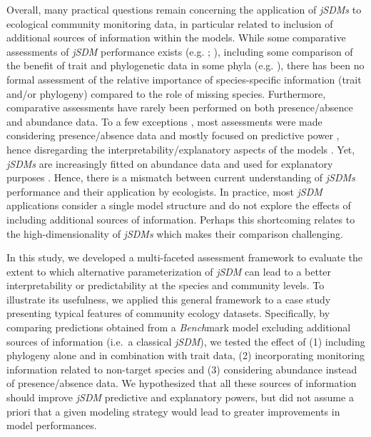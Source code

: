 \documentclass[9pt,biorxiv,doublespacing,lineno]{lapreprint}
\begin{document}
Overall, many practical questions remain concerning the application of
\emph{jSDMs} to ecological community monitoring data, in particular
related to inclusion of additional sources of information within the
models. While some comparative assessments of \emph{jSDM} performance
exists (e.g. \textcite{Norberg_2019} ; \textcite{Wilkinson_2020}),
including some comparison of the benefit of trait and phylogenetic data
in some phyla (e.g. \textcite{Abrego_2022}), there has been no formal
assessment of the relative importance of species-specific information
(trait and/or phylogeny) compared to the role of missing species.
Furthermore, comparative assessments have rarely been performed on both
presence/absence and abundance data. To a few exceptions
\autocite{Waldock_2022}, most assessments were made considering
presence/absence data \autocites[ ]{Norberg_2019}{Wilkinson_2019} and
mostly focused on predictive power \autocites[
]{Norberg_2019}{Wilkinson_2019}, hence disregarding the
interpretability/explanatory aspects of the models
\autocite{Tredennick_2021}. Yet, \emph{jSDMs} are increasingly fitted on
abundance data \autocite{Brimacombe_2020} and used for explanatory
purposes \autocite{Abrego_2016}. Hence, there is a mismatch between
current understanding of \emph{jSDMs} performance and their application
by ecologists. In practice, most \emph{jSDM} applications consider a
single model structure and do not explore the effects of including
additional sources of information. Perhaps this shortcoming relates to
the high-dimensionality of \emph{jSDMs} which makes their comparison
challenging.

In this study, we developed a multi-faceted assessment framework to
evaluate the extent to which alternative parameterization of \emph{jSDM}
can lead to a better interpretability or predictability at the species
and community levels. To illustrate its usefulness, we applied this
general framework to a case study presenting typical features of
community ecology datasets. Specifically, by comparing predictions
obtained from a \emph{Bench}mark model excluding additional sources of
information (i.e.~a classical \emph{jSDM}), we tested the effect of (1)
including phylogeny alone and in combination with trait data, (2)
incorporating monitoring information related to non-target species and
(3) considering abundance instead of presence/absence data. We
hypothesized that all these sources of information should improve
\emph{jSDM} predictive and explanatory powers, but did not assume a
priori that a given modeling strategy would lead to greater improvements
in model performances.
\end{document}
